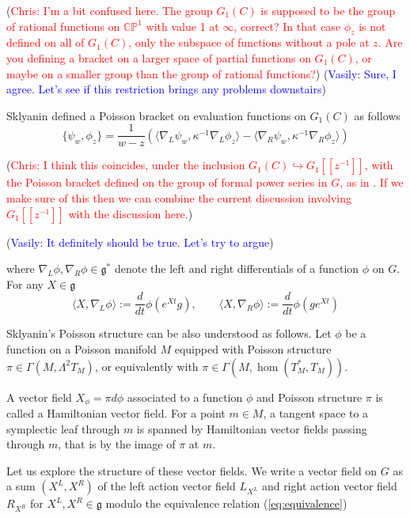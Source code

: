 \documentclass[11pt, oneside, reqno]{amsart}
\theoremstyle{definition} \newtheorem{definition}{Definition}[section]
\theoremstyle{definition} \newtheorem{remark}[definition]{Remark}
\theoremstyle{definition} \newtheorem{remarks}[definition]{Remarks}
\theoremstyle{definition} \newtheorem{question}[definition]{Question}
\theoremstyle{definition} \newtheorem*{note}{Note}
\theoremstyle{definition} \newtheorem{example}[definition]{Example}
\theoremstyle{definition} \newtheorem{examples}[definition]{Examples}
\renewcommand{\gg}{\mathfrak{g}}
\newcommand{\bb}[1]{\mathbb{#1}}
\newcommand{\inj}{\hookrightarrow}
\newcommand{\chris}[1]{(\textcolor{red}{Chris: #1})}
\newcommand{\vasily}[1]{(\textcolor{blue}{Vasily: #1})}
\begin{document}
\chris{I'm a bit confused here.  The group $G_1(C)$ is supposed to be the group of rational functions on $\bb{CP}^1$ with value 1 at $\infty$, correct?  In that case $\phi_z$ is not defined on all of $G_1(C)$, only the subspace of functions without a pole at $z$.  Are you defining a bracket on a larger space of partial functions on $G_1(C)$, or maybe on a smaller group than the group of rational functions?}
\vasily{Sure, I agree. Let's see if this restriction brings any problems downstairs}

Sklyanin defined a Poisson bracket on evaluation functions on $G_1(C)$ as follows
\begin{equation}
\label{eq:Sklyanin}
  \{ \psi_{w}, \phi_{z} \} = \frac{1}{w - z}(\langle \nabla_{L} \psi_w, \kappa^{-1} \nabla_{L} \phi_{z}
\rangle  - \langle \nabla_{R} \psi_{w},  \kappa^{-1} \nabla_{R} \phi_{z}\rangle)
\end{equation}

\chris{I think this coincides, under the inclusion $G_1(C) \inj G_1[[z^{-1}]]$, with the Poisson bracket defined on the group of formal power series in $G$, as in \cite[Theorem 3.10]{Williams}.  If we make sure of this then we can combine the current discussion involving $G_1[[z^{-1}]]$ with the discussion here.}

\vasily{It definitely should be true. Let's try to argue}

where $\nabla_{L}\phi , \nabla_{R}\phi \in \gg^{*} $ denote the left and right differentials
of a function $\phi$ on $G$. For any $X \in \gg$
\begin{equation}
  \langle X, \nabla_{L} \phi \rangle := \frac{d}{dt} \phi(e^{Xt} g),
  \qquad \langle X, \nabla_{R} \phi \rangle := \frac{d}{dt} \phi(g e^{Xt})
\end{equation}

Sklyanin's Poisson structure can be also understood as follows. Let $\phi$ be a function
on a Poisson manifold $M$ equipped with Poisson structure $\pi \in \Gamma(M,\Lambda^2 T_{M})$,
or equivalently with $\pi \in \Gamma(M, \hom (T_{M}^{*}, T_{M}))$. 

A vector field $X_{\phi} = \pi d \phi $ associated to a function $\phi$ and Poisson structure $\pi$ is called a Hamiltonian vector field. For a point $m \in M$, a tangent space to a symplectic
leaf through $m$ is spanned by Hamiltonian vector fields passing through $m$, 
that is by the image of $\pi$ at $m$.

Let us explore the structure of these vector fields. We write a vector field on $G$
as a sum  $(X^L, X^R)$  of the left action vector field $L_{X^L}$ and right action vector field $R_{X^R}$
for $X^L, X^R \in \gg$ modulo the equivalence relation (\ref{eq:equivalence})
\end{document}
